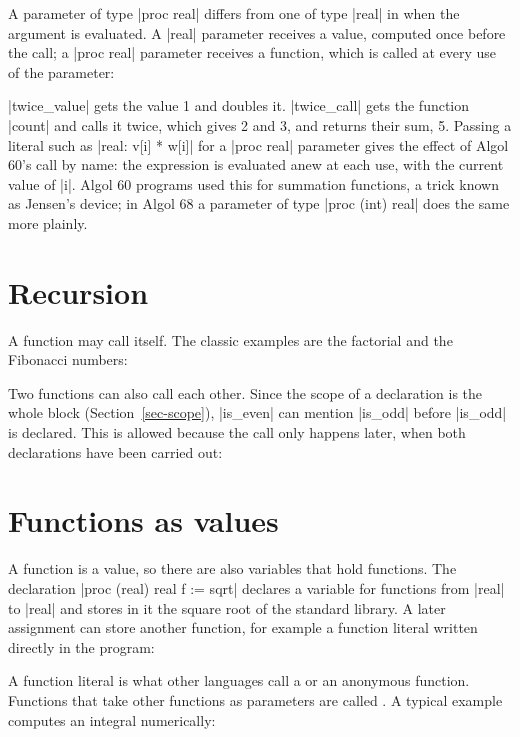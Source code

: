 A parameter of type \code|proc real| differs from one of type
\code|real| in when the argument is evaluated. A \code|real| parameter
receives a value, computed once before the call; a \code|proc real|
parameter receives a function, which is called at every use of the
parameter:


\noindent \code|twice_value| gets the value 1 and doubles it.
\code|twice_call| gets the function \code|count| and calls it twice,
which gives 2 and 3, and returns their sum, 5. Passing a literal such as \code|real: v[i] * w[i]| for a
\code|proc real| parameter gives the effect of Algol 60's call by name:
the expression is evaluated anew at each use, with the current value of
\code|i|. Algol 60 programs used this for summation functions, a trick
known as Jensen's device; in Algol 68 a parameter of type
\code|proc (int) real| does the same more plainly.

\section{Recursion}\label{sec-recursion}

A function may call itself. The classic examples are the factorial and
the Fibonacci numbers:


Two functions can also call each other. Since the scope of a declaration
is the whole block (Section~\ref{sec-scope}), \code|is_even| can mention
\code|is_odd| before \code|is_odd| is declared. This is allowed because
the call only happens later, when both declarations have been carried
out:


\section{Functions as values}\label{sec-proc-values}

A function is a value, so there are also variables that hold functions.
The declaration \code|proc (real) real f := sqrt| declares a variable for
functions from \code|real| to \code|real| and stores in it the square root
of the standard library. A later assignment can store another function,
for example a function literal written directly in the program:


A function literal is what other languages call a  or an
anonymous function. Functions that take other functions as parameters are
called . A typical example computes an
integral numerically:

